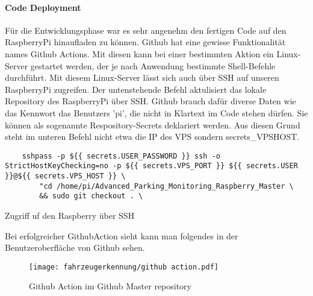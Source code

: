 \paragraph{Code Deployment} \mbox{} 

Für die Entwicklungsphase war es sehr angenehm den fertigen Code auf den RaspberryPi hinaufladen zu können. Github hat eine gewisse Funktionalität names Github Actions. Mit diesen kann bei einer bestimmten Aktion ein Linux-Server gestartet werden, der je nach
Anwendung bestimmte Shell-Befehle durchführt. Mit diesem Linux-Server lässt sich auch über SSH auf unseren RaspberryPi zugreifen. Der untenstehende Befehl aktulisiert das lokale Repository des RaspberryPi über SSH. Github brauch dafür diverse Daten wie das Kennwort
das Benutzers 'pi', die nicht in Klartext im Code stehen dürfen. Sie können als sogenannte Respository-Secrets deklariert werden. Aus diesen Grund steht im unteren Befehl nicht etwa die IP des VPS sondern secrets\_VPSHOST.  

\begin{listing}[H]
    \begin{verbatim}
    sshpass -p ${{ secrets.USER_PASSWORD }} ssh -o StrictHostKeyChecking=no -p ${{ secrets.VPS_PORT }} ${{ secrets.USER }}@${{ secrets.VPS_HOST }} \
        "cd /home/pi/Advanced_Parking_Monitoring_Raspberry_Master \
        && sudo git checkout . \
    \end{verbatim}
    \caption{Zugriff uf den Raspberry über SSH}
\end{listing}

Bei erfolgreicher GithubAction sieht kann man folgendes in der Benutzeroberfläche von Github sehen.

\begin{figure}[H]
    \centering
    \texttt{[image: fahrzeugerkennung/github action.pdf]}
    \caption{Github Action im Github Master repository}
\end{figure}


\pagebreak


